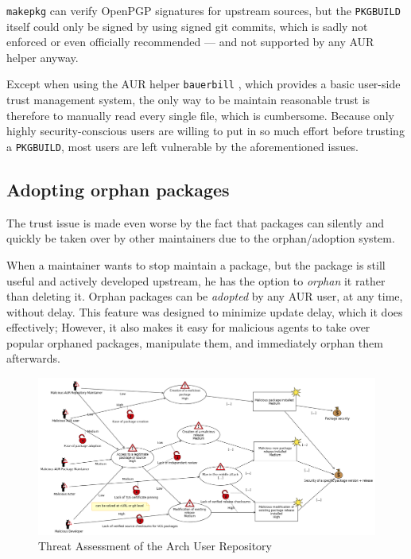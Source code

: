 \texttt{makepkg} can verify OpenPGP signatures for upstream sources, but the \texttt{PKGBUILD} itself could only be signed by using signed git commits, which is sadly not enforced or even officially recommended --- and not supported by any AUR helper anyway.

Except when using the AUR helper \texttt{bauerbill} \cite{bauerbill}, which provides a basic user-side trust management system, the only way to be maintain reasonable trust is therefore to manually read every single file, which is cumbersome.
Because only highly security-conscious users are willing to put in so much effort before trusting a \texttt{PKGBUILD}, most users are left vulnerable by the aforementioned issues.

\subsection*{Adopting orphan packages}
The trust issue is made even worse by the fact that packages can silently and quickly be taken over by other maintainers due to the orphan/adoption system.

When a maintainer wants to stop maintain a package, but the package is still useful and actively developed upstream, he has the option to \emph{orphan} it rather than deleting it.
Orphan packages can be \emph{adopted} by any AUR user, at any time, without delay.
This feature was designed to minimize update delay, which it does effectively; However, it also makes it easy for malicious agents to take over popular orphaned packages, manipulate them, and immediately orphan them afterwards.

\begin{center}
\begin{figure}
	\includegraphics[width=\textwidth,trim={0 0 245 0},clip]{img/threat.png}
	\caption[Threat Assessment]{Threat Assessment of the Arch User Repository}
	\label{fig:threat}
\end{figure}
\end{center}

